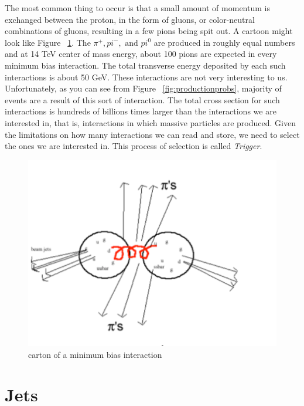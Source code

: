 The most common thing to occur is that a small amount of momentum is exchanged between the proton, in the form of gluons, or color-neutral combinations of gluons, resulting in a few pions being spit out. A cartoon might look like Figure ~\ref{fig:minbias}. The $\pi^+, pi^-, \text{ and } pi^0 $ are produced in roughly equal numbers and at 14 TeV center of mass energy, about 100 pions are expected in every minimum bias interaction. The total transverse energy deposited by each such interactions is about 50 GeV.  These interactions are not very interesting to us. Unfortunately, as you can see from Figure ~\ref{fig:productionprobs}, majority of events are a result of this sort of interaction. The total cross section for such interactions is hundreds of billions times larger than the interactions we are interested in, that is, interactions in which massive particles are produced. Given the limitations on how many interactions we can read and store, we need to select the ones we are interested in. This process of selection is called {\it Trigger}. 

\begin{figure}[h]
\centering\includegraphics[scale=0.5]{./protonprotoncollisions/Pictures/fig6.pdf}
\caption{carton of a minimum bias interaction}
\label{fig:minbias}
\end{figure}

\section{Jets}

